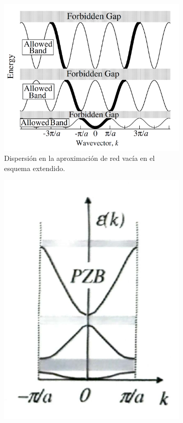 \begin{figure}[h!] \centering
	\begin{subfigure}{0.45\linewidth} \centering 
		\includegraphics[scale=0.29]{Cuerpo/Ch_07/Oxford-03.png}
		\caption{Dispersión en la aproximación de red vacía en el esquema extendido.}
		\label{Fig:07-03a}
	\end{subfigure} 
	\begin{subfigure}{0.45\linewidth} \centering
		\includegraphics[scale=0.4]{Cuerpo/Ch_07/04.png}

\end{subfigure}
\end{figure}
